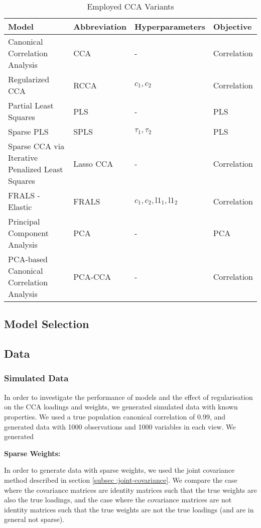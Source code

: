 \begin{table}[h]
\centering
\caption{Employed CCA Variants}
\begin{tabular}{|l|l|l|l|}
\hline
\textbf{Model} & \textbf{Abbreviation} & \textbf{Hyperparameters} & \textbf{Objective} \\
\hline
Canonical Correlation Analysis & CCA & - & Correlation \\
\hline
Regularized CCA & RCCA & \(c_1, c_2\) & Correlation \\
\hline
Partial Least Squares & PLS & - & PLS \\
\hline
Sparse PLS & SPLS & \(\tau_1, \tau_2\) & PLS \\
\hline
Sparse CCA via Iterative Penalized Least Squares & Lasso CCA & - & Correlation \\
\hline
FRALS - Elastic & FRALS & \(c_1, c_2, \text{l1}_1, \text{l1}_2\) & Correlation \\
\hline
Principal Component Analysis & PCA & - & PCA \\
\hline
PCA-based Canonical Correlation Analysis & PCA-CCA & - & Correlation \\
\hline
\end{tabular}
\label{table:cca-variants}
\end{table}


\subsection{Model Selection}\label{subsec:model-selection}

\subsection{Data}

\subsubsection{Simulated Data}

In order to investigate the performance of models and the effect of regularisation on the CCA loadings and weights,
we generated simulated data with known properties. We used a true population canonical correlation of 0.99, and
generated data with 1000 observations and 1000 variables in each view. We generated

\textbf{Sparse Weights:}

In order to generate data with sparse weights, we used the joint covariance method described in section \ref{subsec
:joint-covariance}. We compare the case where the covariance matrices are identity matrices such that the true weights
are also the true loadings, and the case where the covariance matrices are not identity matrices such that the true
weights are not the true loadings (and are in general not sparse).

